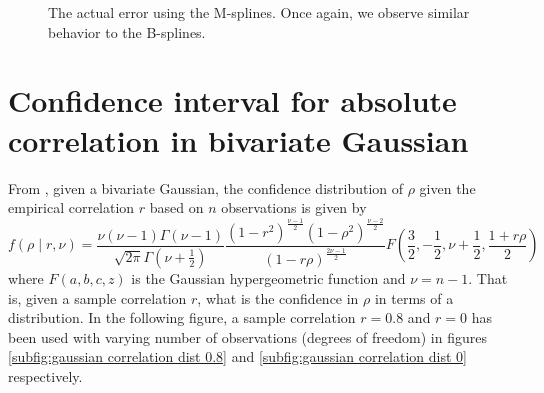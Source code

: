 \documentclass[../Thesis.tex]{subfiles}
\begin{document}
\begin{figure}[H]
\begin{subfigure}[t]{0.4\textwidth}
        \caption{}
    \end{subfigure}
    \caption{The actual error using the M-splines. Once again, we observe similar behavior to the B-splines.}
    \label{fig:M-spline approach results MI - error}
\end{figure}





\newpage
\section{Confidence interval for absolute correlation in bivariate Gaussian}\label{sec:bivar gauss abs correlation CI}
From \cite{Confidence_in_Correlation}, given a bivariate Gaussian, the confidence distribution of $\rho$ given the empirical correlation $r$ based on $n$ observations is given by
$$f\left(\rho \mid r,\nu\right) = \frac{\nu (\nu-1) \Gamma(\nu-1)}{\sqrt{2\pi} \Gamma(\nu + \frac{1}{2})} \frac{\left(1-r^2\right)^{\frac{\nu-1}{2}} \left(1-\rho^2\right)^{\frac{\nu-2}{2}} }{\left(1-r\rho\right)^{\frac{2\nu-1}{2}}} F\left(\frac{3}{2}, -\frac{1}{2}, \nu+\frac{1}{2}, \frac{1+r\rho}{2}\right)$$
where $F\left(a,b,c,z\right)$ is the Gaussian hypergeometric function and $\nu = n-1$. That is, given a sample correlation $r$, what is the confidence in $\rho$ in terms of a distribution. In the following figure, a sample correlation $r=0.8$ and $r=0$ has been used with varying number of observations (degrees of freedom) in figures \autoref{subfig:gaussian correlation dist 0.8} and \autoref{subfig:gaussian correlation dist 0} respectively.
\end{document}
